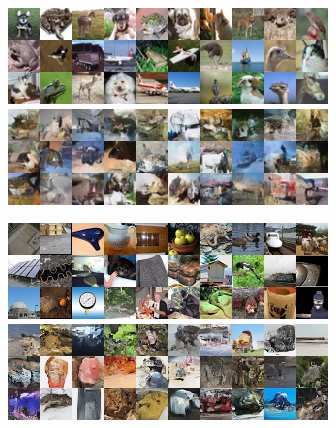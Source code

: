 \documentclass{article}
\begin{document}
\begin{figure}
\begin{center}
    \includegraphics[width=.47\textwidth]{fig_cifar10_examples.jpg} \hfill
    \includegraphics[width=.47\textwidth]{fig_cifar10_samples.jpg} \\\vspace{1mm}

    \includegraphics[width=.47\textwidth]{fig_imnet_32_examples.jpg} \hfill
    \includegraphics[width=.47\textwidth]{fig_imnet_32_samples.jpg} \\\vspace{1mm}


\end{center}
\end{figure}
\end{document}
